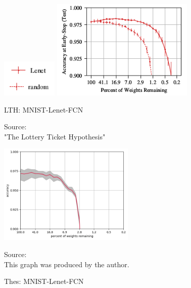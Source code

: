 \begin{figure}
	\begin{minipage}{\textwidth}
		\centering
		\includegraphics[width=100px]{gfx/7-Evaluation/LTH_3_legend.png}
	\end{minipage}
	\begin{minipage}{0.5\textwidth}
		\centering
		\includegraphics[height=180px]{gfx/7-Evaluation/LTH_0.png}
		\caption{LTH: MNIST-Lenet-FCN}
		\vspace{7pt}
		\footnotesize{
			Source:\\
			"The Lottery Ticket Hypothesis" \cite{LTH}
		}
		\label{fig:MNIST-Lenet-FCN-LTH}
	\end{minipage}\hfill
	\begin{minipage}{0.5\textwidth}
		\centering
		\includegraphics[height=180px]{gfx/Experiments/Reproduction-MNIST-FCN/accuracy/converged.png}
		\caption{Thes: MNIST-Lenet-FCN}
		\vspace{7pt}
		\footnotesize{
			Source:\\
			This graph was produced by the author.
		}
		\label{fig:MNIST-Lenet-FCN-Thesis}
	\end{minipage}
\end{figure}

